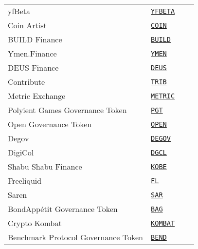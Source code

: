 \begin{tabular}{llll}
yfBeta & \href{https://etherscan.io/address/0x89ee58af4871b474c30001982c3d7439c933c838}{\tt YFBETA} \\
Coin Artist & \href{https://etherscan.io/address/0x87b008E57F640D94Ee44Fd893F0323AF933F9195}{\tt COIN} \\
BUILD Finance & \href{https://etherscan.io/address/0x6e36556b3ee5aa28def2a8ec3dae30ec2b208739}{\tt BUILD} \\
Ymen.Finance & \href{https://etherscan.io/address/0xd0c59798f986d333554688cd667033d469c2398e}{\tt YMEN} \\
DEUS Finance & \href{https://etherscan.io/address/0x3b62F3820e0B035cc4aD602dECe6d796BC325325}{\tt DEUS} \\
Contribute & \href{https://etherscan.io/address/0xe09216f1d343dd39d6aa732a08036fee48555af0}{\tt TRIB} \\
Metric Exchange & \href{https://etherscan.io/address/0xefc1c73a3d8728dc4cf2a18ac5705fe93e5914ac}{\tt METRIC} \\
Polyient Games Governance Token & \href{https://etherscan.io/address/0xeaccb6E0f24d66cF4Aa6cBDa33971b9231d332a1}{\tt PGT} \\
Open Governance Token & \href{https://etherscan.io/address/0x69e8b9528CABDA89fe846C67675B5D73d463a916}{\tt OPEN} \\
Degov & \href{https://etherscan.io/address/0x469E66e06fEc34839E5eB1273ba85A119B8D702F}{\tt DEGOV} \\
DigiCol & \href{https://etherscan.io/address/0x63B8b7d4A3EFD0735c4BFFBD95B332a55e4eB851}{\tt DGCL} \\
Shabu Shabu Finance & \href{https://etherscan.io/address/0xCb4e8CafEDa995da5cEdfda5205BD5664a12b848}{\tt KOBE} \\
Freeliquid & \href{https://etherscan.io/address/0xfFED56a180f23fD32Bc6A1d8d3c09c283aB594A8}{\tt FL} \\
Saren & \href{https://etherscan.io/address/0xbd4a858139b155219e2c8d10135003fdef720b6b}{\tt SAR} \\
BondAppétit Governance Token & \href{https://etherscan.io/address/0x28A06c02287e657ec3F8e151A13C36A1D43814b0}{\tt BAG} \\
Crypto Kombat & \href{https://etherscan.io/address/0x878cf148ccbb50426043a9affe54ba408221c7fa}{\tt KOMBAT} \\
Benchmark Protocol Governance Token & \href{https://etherscan.io/address/0xe0d8ed14cf46b5c12721df75460cb24495d01af3}{\tt BEND} \\
\bottomrule
\end{tabular}
